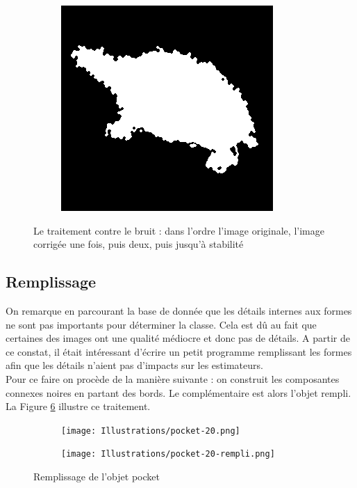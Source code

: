 \documentclass{article}
\theoremstyle{definition}
\begin{document}
\begin{figure}[!h]
\begin{subfigure}{.24\textwidth}
	  \label{1stcup-rempli}
	  \end{subfigure}
	  \begin{subfigure}{.24\textwidth}
	    \centering
	    \includegraphics[scale=0.3]{Illustrations/turtle-1-bruitf.png}
	  \label{2ndcup-rempli}
	  \end{subfigure}
	\caption{Le traitement contre le bruit : dans l'ordre l'image originale, l'image corrigée une fois, puis deux, puis jusqu'à stabilité}
	\label{Traitement-Bruit}
    \end{figure}
    
    \subsection{Remplissage}
    \label{sec:remplissage}
    
      On remarque en parcourant la base de donnée que les détails internes aux formes ne sont pas importants pour déterminer la classe. Cela est dû au fait que certaines des images ont une qualité médiocre et donc pas de détails. A partir de ce constat, il était intéressant d'écrire un petit programme remplissant les formes afin que les détails n'aient pas d'impacts sur les estimateurs. \\
      
      Pour ce faire on procède de la manière suivante : on construit les composantes connexes noires en partant des bords. Le complémentaire est alors l'objet rempli. \\
      
      La Figure \ref{remplissage} illustre ce traitement.
    
      \begin{figure}[!h]
	\centering
	\begin{subfigure}{.25\textwidth}
	  \centering
	  \texttt{[image: Illustrations/pocket-20.png]}
	  \label{pocket-non-rempli}
	\end{subfigure}
	\begin{subfigure}{.25\textwidth}
	  \centering
	  \texttt{[image: Illustrations/pocket-20-rempli.png]}
	\label{pocket-rempli}
	\end{subfigure}
	\caption{Remplissage de l'objet pocket}
	\label{remplissage}
      \end{figure}
      
\end{document}
